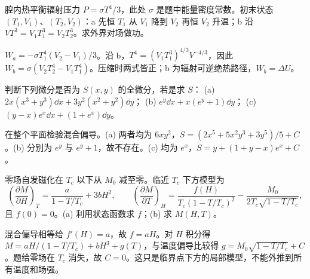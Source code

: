 \begin{exercise}
腔内热平衡辐射压力 $P=\sigma T^4/3$，此处 $\sigma$ 是题中能量密度常数。初末状态 $(T_1,V_1)$、$(T_2,V_2)$：a 先恒 $T_1$ 从 $V_1$ 降到 $V_2$ 再恒 $V_2$ 升温；b 沿 $VT^3=V_1T_1^3=V_2T_2^3$。求外界对场做功。
\end{exercise}
\begin{solution}
$W_a=-\sigma T_1^4(V_2-V_1)/3$。沿 b，$T^4=(V_1T_1^3)^{4/3}V^{-4/3}$，因此 $W_b=\sigma(V_2T_2^4-V_1T_1^4)$。压缩时两式皆正；b 为辐射可逆绝热路径，$W_b=\Delta U$。
\end{solution}
\begin{exercise}
判断下列微分是否为 $S(x,y)$ 的全微分，若是求 $S$：
(a) $2x(x^3+y^3)\dd x+3y^2(x^2+y^2)\dd y$；
(b) $e^y\dd x+x(e^y+1)\dd y$；
(c) $(y-x)e^x\dd x+(1+e^x)\dd y$。
\end{exercise}
\begin{solution}
在整个平面检验混合偏导。(a) 两者均为 $6xy^2$，$S=(2x^5+5x^2y^3+3y^5)/5+C$。(b) 分别为 $e^y$ 与 $e^y+1$，故不存在。(c) 均为 $e^x$，$S=y+(1+y-x)e^x+C$。
\end{solution}
\begin{exercise}
零场自发磁化在 $T_c$ 以下从 $M_0$ 减至零。临近 $T_c$ 下方模型为
\[\left(\frac{\partial M}{\partial H}\right)_T=\frac a{1-T/T_c}+3bH^2,\qquad
\left(\frac{\partial M}{\partial T}\right)_H=\frac{f(H)}{T_c(1-T/T_c)^2}-\frac{M_0}{2T_c\sqrt{1-T/T_c}},\]
且 $f(0)=0$。(a) 利用状态函数求 $f$；(b) 求 $M(H,T)$。
\end{exercise}
\begin{solution}
混合偏导相等给 $f'(H)=a$，故 $f=aH$。对 $H$ 积分得 $M=aH/(1-T/T_c)+bH^3+g(T)$，与温度偏导比较得 $g=M_0\sqrt{1-T/T_c}+C$。题给零场在 $T_c$ 消失，故 $C=0$。这只是临界点下方的局部模型，不能外推到所有温度和场强。
\end{solution}
